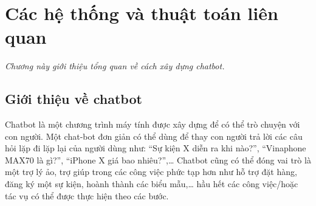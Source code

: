 \chapter{Các hệ thống và thuật toán liên quan}
\label{Chapter2}

\emph{Chương này giới thiệu tổng quan về cách xây dựng chatbot.}

\section{Giới thiệu về chatbot}
Chatbot là một chương trình máy tính được xây dựng để có thể trò chuyện với con người. Một chat-bot đơn giản có thể dùng để thay con người trả lời các câu hỏi lặp đi lặp lại của người dùng như: “Sự kiện X diễn ra khi nào?”, “Vinaphone MAX70 là gì?”, “iPhone X giá bao nhiêu?”,… Chatbot cũng có thể đóng vai trò là một trợ lý ảo, trợ giúp trong các công việc phức tạp hơn như hỗ trợ đặt hàng, đăng ký một sự kiện, hoành thành các biểu mẫu,… hầu hết các công việc/hoặc tác vụ có thể được thực hiện theo các bước.

